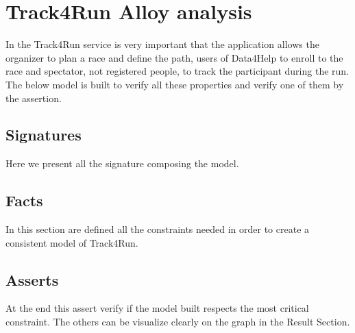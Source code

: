 \section{Track4Run Alloy analysis}

    In the Track4Run service is very important that the application allows the organizer to plan a race and define the path, users of Data4Help to enroll to the race and spectator, not registered people, to track the participant during the run. The below model is built to verify all these properties and verify one of them by the assertion.

    \subsection{Signatures}
        
        Here we present all the signature composing the model.
        
        
    
    \subsection{Facts}
 
        In this section are defined all the constraints needed in order to create a consistent model of Track4Run.
    
        

    \subsection{Asserts}
    
        At the end this assert verify if the model built respects the most critical constraint. The others can be visualize clearly on the graph in the Result Section.
    
        
